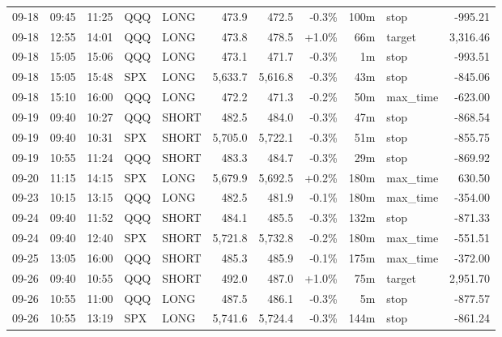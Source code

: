 \documentclass[11pt,a4paper,twoside]{article}
\begin{document}
\begin{center}
\begin{longtable}{>{\color{txtmain}}l l l l l r r r r >{\color{txtmain}}l r}
09-18 & 09:45 & 11:25 & QQQ & LONG & 473.9 & 472.5 & \textcolor{lossred}{-0.3\%} & 100m & stop & \textcolor{lossred}{-995.21} \\
09-18 & 12:55 & 14:01 & QQQ & LONG & 473.8 & 478.5 & \textcolor{wingreen}{+1.0\%} & 66m & target & \textcolor{wingreen}{3,316.46} \\
09-18 & 15:05 & 15:06 & QQQ & LONG & 473.1 & 471.7 & \textcolor{lossred}{-0.3\%} & 1m & stop & \textcolor{lossred}{-993.51} \\
09-18 & 15:05 & 15:48 & SPX & LONG & 5,633.7 & 5,616.8 & \textcolor{lossred}{-0.3\%} & 43m & stop & \textcolor{lossred}{-845.06} \\
09-18 & 15:10 & 16:00 & QQQ & LONG & 472.2 & 471.3 & \textcolor{lossred}{-0.2\%} & 50m & max\_time & \textcolor{lossred}{-623.00} \\
09-19 & 09:40 & 10:27 & QQQ & SHORT & 482.5 & 484.0 & \textcolor{lossred}{-0.3\%} & 47m & stop & \textcolor{lossred}{-868.54} \\
09-19 & 09:40 & 10:31 & SPX & SHORT & 5,705.0 & 5,722.1 & \textcolor{lossred}{-0.3\%} & 51m & stop & \textcolor{lossred}{-855.75} \\
09-19 & 10:55 & 11:24 & QQQ & SHORT & 483.3 & 484.7 & \textcolor{lossred}{-0.3\%} & 29m & stop & \textcolor{lossred}{-869.92} \\
09-20 & 11:15 & 14:15 & SPX & LONG & 5,679.9 & 5,692.5 & \textcolor{wingreen}{+0.2\%} & 180m & max\_time & \textcolor{wingreen}{630.50} \\
09-23 & 10:15 & 13:15 & QQQ & LONG & 482.5 & 481.9 & \textcolor{lossred}{-0.1\%} & 180m & max\_time & \textcolor{lossred}{-354.00} \\
09-24 & 09:40 & 11:52 & QQQ & SHORT & 484.1 & 485.5 & \textcolor{lossred}{-0.3\%} & 132m & stop & \textcolor{lossred}{-871.33} \\
09-24 & 09:40 & 12:40 & SPX & SHORT & 5,721.8 & 5,732.8 & \textcolor{lossred}{-0.2\%} & 180m & max\_time & \textcolor{lossred}{-551.51} \\
09-25 & 13:05 & 16:00 & QQQ & SHORT & 485.3 & 485.9 & \textcolor{lossred}{-0.1\%} & 175m & max\_time & \textcolor{lossred}{-372.00} \\
09-26 & 09:40 & 10:55 & QQQ & SHORT & 492.0 & 487.0 & \textcolor{wingreen}{+1.0\%} & 75m & target & \textcolor{wingreen}{2,951.70} \\
09-26 & 10:55 & 11:00 & QQQ & LONG & 487.5 & 486.1 & \textcolor{lossred}{-0.3\%} & 5m & stop & \textcolor{lossred}{-877.57} \\
09-26 & 10:55 & 13:19 & SPX & LONG & 5,741.6 & 5,724.4 & \textcolor{lossred}{-0.3\%} & 144m & stop & \textcolor{lossred}{-861.24} \\

\end{longtable}
\end{center}
\end{document}
